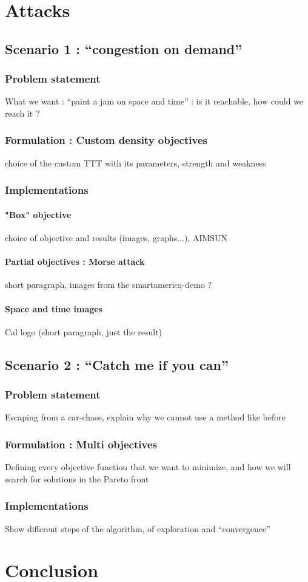\documentclass{article}
\theoremstyle{definition}
\theoremstyle{remark}
\begin{document}
\section{Attacks}
	\subsection{Scenario 1 : ``congestion on demand''}
		\subsubsection{Problem statement}
			What we want : ``paint a jam on space and time'' : is it reachable, how could we reach it ?
		\subsubsection{Formulation : Custom density objectives}
			choice of the custom TTT with its parameters, strength and weakness
		\subsubsection{Implementations}
			\paragraph{"Box" objective}
				choice of objective and results (images, graphs...), AIMSUN
			\paragraph{Partial objectives : Morse attack}
				short paragraph, images from the smartamerica-demo ?
			\paragraph{Space and time images}
				Cal logo (short paragraph, just the result)
	\subsection{Scenario 2 : ``Catch me if you can''}
		\subsubsection{Problem statement}
			Escaping from a car-chase, explain why we cannot use a method like before
		\subsubsection{Formulation : Multi objectives}
			Defining every objective function that we want to minimize, and how we will search for solutions in the Pareto front
		\subsubsection{Implementations}
			Show different steps of the algorithm, of exploration and ``convergence''
\section*{Conclusion}
\end{document}
